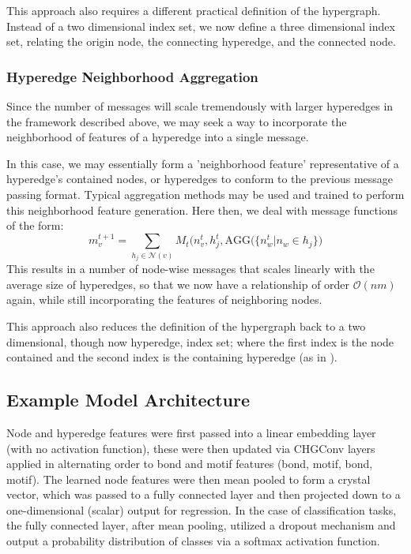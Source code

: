\documentclass[10pt,a4paper]{article}
\begin{document}
This approach also requires a different practical definition of the hypergraph.  Instead of a two dimensional index set, we now define a three dimensional index set, relating the origin node, the connecting hyperedge, and the connected node.

\subsubsection{Hyperedge Neighborhood Aggregation}
Since the number of messages will scale tremendously with larger hyperedges in the framework described above, we may seek a way to incorporate the neighborhood of features of a hyperedge into a single message.

In this case, we may essentially form a 'neighborhood feature' representative of a hyperedge's contained nodes, or hyperedges to conform to the previous message passing format. Typical aggregation methods may be used and trained to perform this neighborhood feature generation. Here then, we deal with message functions of the form:
$$
m_v^{t+1}=\sum_{h_j\in \mathcal{N}(v)} M_t(n_v^{t},h_j^{t},\text{AGG}\big(\lbrace n_w^t \vert n_w \in h_j \rbrace\big)
$$
This results in a number of node-wise messages that scales linearly with the average size of hyperedges, so that we now have a relationship of order $\mathcal{O}(nm)$ again, while still incorporating the features of neighboring nodes.

This approach also reduces the definition of the hypergraph back to a two dimensional, though now hyperedge, index set; where the first index is the node contained and the second index is the containing hyperedge (as in \cite{hypergraphconv}).




\subsection{Example Model Architecture}
Node and hyperedge features were first passed into a linear embedding layer (with no activation function), these were then updated via CHGConv layers applied in alternating order to bond and motif features (bond, motif, bond, motif). The learned node features were then mean pooled to form a crystal vector, which was passed to a fully connected layer and then projected down to a one-dimensional (scalar) output for regression. In the case of classification tasks, the fully connected layer, after mean pooling, utilized a dropout mechanism and output a probability distribution of classes via a softmax activation function.
\end{document}
